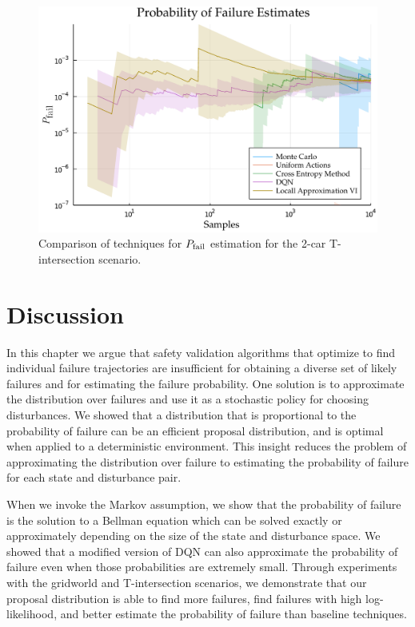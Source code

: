 \begin{figure}
        \centering
        \includegraphics[width=\textwidth]{figures/distribution_over_failures/pfail_2car_left.pdf}
        \caption{Comparison of techniques for $P_{\rm fail}$ estimation for the 2-car T-intersection scenario.}
        \label{fig:ch5_2car_pfail_estimation}
\end{figure}

\section{Discussion}

In this chapter we argue that safety validation algorithms that optimize to find individual failure trajectories are insufficient for obtaining a diverse set of likely failures and for estimating the failure probability. One solution is to approximate the distribution over failures and use it as a stochastic policy for choosing disturbances. We showed that a distribution that is proportional to the probability of failure can be an efficient proposal distribution, and is optimal when applied to a deterministic environment. This insight reduces the problem of approximating the distribution over failure to estimating the probability of failure for each state and disturbance pair. 

When we invoke the Markov assumption, we show that the probability of failure is the solution to a Bellman equation which can be solved exactly or approximately depending on the size of the state and disturbance space. We showed that a modified version of DQN can also approximate the probability of failure even when those probabilities are extremely small. Through experiments with the gridworld and T-intersection scenarios, we demonstrate that our proposal distribution is able to find more failures, find failures with high log-likelihood, and better estimate the probability of failure than baseline techniques. 

